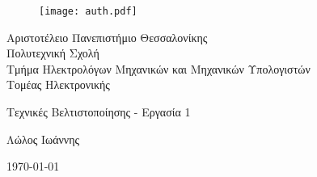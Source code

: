 \begin{titlepage}

\begin{figure}[H]
  \begin{center}
    \texttt{[image: auth.pdf]}
    \label{fig:cover_auth_logo}
  \end{center}
\end{figure}

\centering
\Large Αριστοτέλειο Πανεπιστήμιο Θεσσαλονίκης\\
\Large Πολυτεχνική Σχολή\\
\large Τμήμα Ηλεκτρολόγων Μηχανικών και Μηχανικών Υπολογιστών\\
\large Τομέας Ηλεκτρονικής

\vspace{\fill}

\LARGE Τεχνικές Βελτιστοποίησης - Εργασία 1

\vspace{\fill}

\Large Λώλος Ιωάννης


\vspace{\fill}
\raggedright



\centering
\vspace{\fill}
\today

\end{titlepage}

